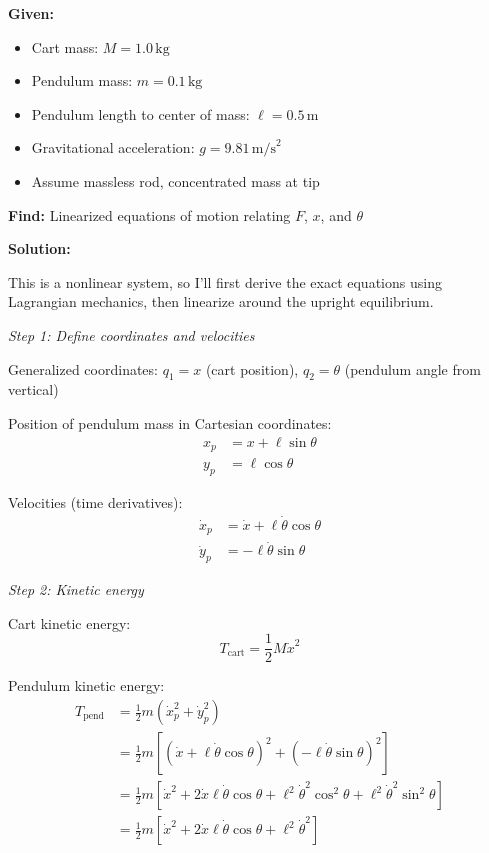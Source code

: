\begin{example}
\begin{center}
\end{center}

\textbf{Given:}
\begin{itemize}
    \item Cart mass: $M = 1.0\,\text{kg}$
    \item Pendulum mass: $m = 0.1\,\text{kg}$
    \item Pendulum length to center of mass: $\ell = 0.5\,\text{m}$
    \item Gravitational acceleration: $g = 9.81\,\text{m/s}^2$
    \item Assume massless rod, concentrated mass at tip
\end{itemize}

\textbf{Find:} Linearized equations of motion relating $F$, $x$, and $\theta$

\textbf{Solution:}

This is a nonlinear system, so I'll first derive the exact equations using Lagrangian mechanics, then linearize around the upright equilibrium.

\textit{Step 1: Define coordinates and velocities}

Generalized coordinates: $q_1 = x$ (cart position), $q_2 = \theta$ (pendulum angle from vertical)

Position of pendulum mass in Cartesian coordinates:
\begin{align}
x_p &= x + \ell\sin\theta \\
y_p &= \ell\cos\theta
\end{align}

Velocities (time derivatives):
\begin{align}
\dot{x}_p &= \dot{x} + \ell\dot{\theta}\cos\theta \\
\dot{y}_p &= -\ell\dot{\theta}\sin\theta
\end{align}

\textit{Step 2: Kinetic energy}

Cart kinetic energy:
\begin{equation}
T_{\text{cart}} = \frac{1}{2}M\dot{x}^2
\end{equation}

Pendulum kinetic energy:
\begin{align}
T_{\text{pend}} &= \frac{1}{2}m(\dot{x}_p^2 + \dot{y}_p^2) \\
&= \frac{1}{2}m[(\dot{x} + \ell\dot{\theta}\cos\theta)^2 + (-\ell\dot{\theta}\sin\theta)^2] \\
&= \frac{1}{2}m[\dot{x}^2 + 2\dot{x}\ell\dot{\theta}\cos\theta + \ell^2\dot{\theta}^2\cos^2\theta + \ell^2\dot{\theta}^2\sin^2\theta] \\
&= \frac{1}{2}m[\dot{x}^2 + 2\dot{x}\ell\dot{\theta}\cos\theta + \ell^2\dot{\theta}^2]
\end{align}


\end{example}
